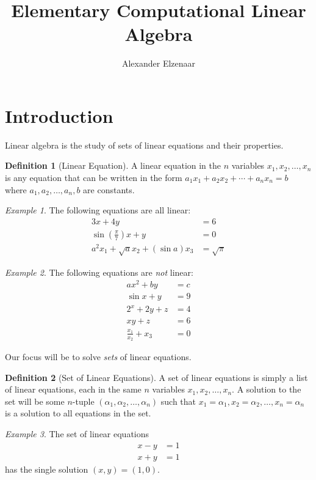 \documentclass[10pt, a4paper]{amsart}
\title{Elementary Computational Linear Algebra}
\author{Alexander Elzenaar}
\theoremstyle{definition}
\newtheorem{defn}{Definition}
\theoremstyle{remark}
\newtheorem{ex}{Example}
\begin{document}
\maketitle

\section{Introduction}
Linear algebra is the study of sets of linear equations and their properties.

\begin{defn}[Linear Equation]
  A linear equation in the $ n $ variables $ x_1, x_2, \dots, x_n $ is any
  equation that can be written in the form $ a_1 x_1 + a_2 x_2 + \cdots + a_n x_n = b $
  where $ a_1, a_2, \dots, a_n, b $ are constants.
\end{defn}

\begin{ex}
  The following equations are all linear:
  \begin{align*}
    3x + 4y &= 6\\
    \sin\left(\frac{\pi}{7}\right) x + y &= 0\\
    a^2 x_1 + \sqrt{a} x_2 + (\sin a) x_3 &= \sqrt{\pi}
  \end{align*}
\end{ex}

\begin{ex}
  The following equations are \emph{not} linear:
  \begin{align*}
    ax^2 + by &= c\\
    \sin x + y &= 9\\
    2^x + 2y + z &= 4\\
    xy + z &= 6\\
    \frac{x_1}{x_2} + x_3 &= 0
  \end{align*}
\end{ex}

Our focus will be to solve \emph{sets} of linear equations.

\begin{defn}[Set of Linear Equations]
  A set of linear equations is simply a list of linear
  equations, each in the same $ n $ variables $ x_1, x_2, \dots, x_n $. A solution to
  the set will be some $ n$-tuple $ (\alpha_1, \alpha_2, \dots, \alpha_n) $ such that
  $ x_1 = \alpha_1, x_2 = \alpha_2, \dots, x_n = \alpha_n $ is a solution to all
  equations in the set.
\end{defn}

\begin{ex}
  The set of linear equations
  \begin{align*}
    x - y &= 1\\
    x + y &= 1
  \end{align*}
  has the single solution $ (x, y) = (1, 0) $.
\end{ex}
\end{document}
